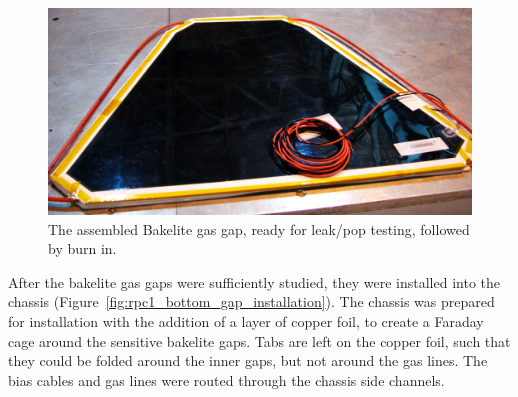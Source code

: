 \begin{figure}
  \centering
  \includegraphics[width=0.7\linewidth]{./figures/rpc1_construction_3}
  \caption{
    The assembled Bakelite gas gap, ready for leak/pop testing, followed by burn
    in.
  }
  \label{fig:rpc1_construction_3}
\end{figure}

After the bakelite gas gaps were sufficiently studied, they were installed into
the chassis (Figure~\ref{fig:rpc1_bottom_gap_installation}). The chassis was
prepared for installation with the addition of a layer of copper foil, to create
a Faraday cage around the sensitive bakelite gaps. Tabs are left on the copper
foil, such that they could be folded around the inner gaps, but not around the
gas lines. The bias cables and gas lines were routed through the chassis side
channels.

